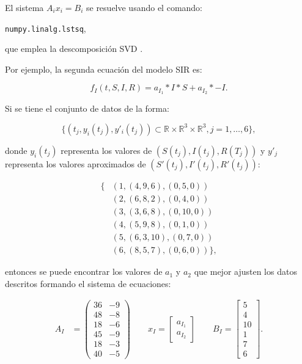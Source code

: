 El sistema $A_ix_i = B_i$ se resuelve usando el comando:

\texttt{numpy.linalg.lstsq},

que emplea la descomposición SVD \cite{numpy-lstsq}.

Por ejemplo, la segunda ecuación del modelo SIR es:

$$f_I (t,S,I,R) = a_{I_1} * I * S + a_{I_2} * -I.$$

Si se tiene el conjunto de datos de la forma:

$$\{(t_j, y_i(t_j), y'_i(t_j)) \subset \mathbb{R} \times \mathbb{R}^{3} \times \mathbb{R}^3, j = 1, \dots, 6\},$$

donde $y_i(t_j)$ representa los valores de $(S(t_j), I(t_j), R(T_j))$ y $y'_j$ representa los valores aproximados de $(S'(t_j), I'(t_j), R'(t_j))$:

\begin{align*}
    \{ & (1, (4, 9, 6)  ,  (0, 5, 0))        \\
       & (2, (6, 8, 2)     ,  (0, 4, 0))     \\
       & (3, (3, 6, 8)     ,  (0, 10, 0))    \\
       & (4, (5, 9, 8)     ,  (0, 1, 0))     \\
       & (5, (6, 3, 10)    , (0, 7, 0))      \\
       & (6, (8, 5, 7)     ,  (0, 6, 0)) \},
\end{align*}

entonces se puede encontrar los valores de $a_1$ y $a_2$ que mejor ajusten los datos descritos formando el sistema de ecuaciones:

\begin{align*}
    A_I & = \begin{pmatrix}
        36 & -9 \\
        48 & -8 \\
        18 & -6 \\
        45 & -9 \\
        18 & -3 \\
        40 & -5
    \end{pmatrix}
    \qquad
    x_I = \begin{bmatrix}
        a_{I_1} \\
        a_{I_2}
    \end{bmatrix}
    \qquad
    B_I = \begin{bmatrix}
        5  \\
        4  \\
        10 \\
        1  \\
        7  \\
        6
    \end{bmatrix}.
\end{align*}


